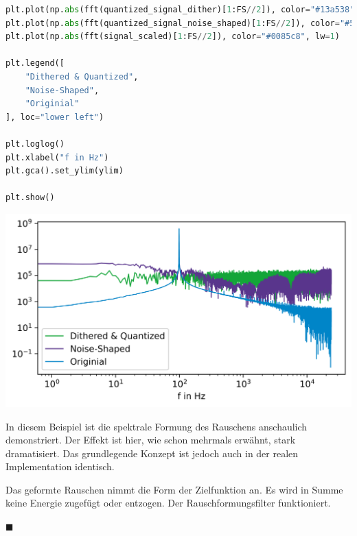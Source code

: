 \begin{lstlisting}[language=Python]
plt.plot(np.abs(fft(quantized_signal_dither)[1:FS//2]), color="#13a538", lw=1)
plt.plot(np.abs(fft(quantized_signal_noise_shaped)[1:FS//2]), color="#59358c", lw=1)
plt.plot(np.abs(fft(signal_scaled)[1:FS//2]), color="#0085c8", lw=1)

plt.legend([
    "Dithered & Quantized",
    "Noise-Shaped",
    "Originial"
], loc="lower left")

plt.loglog()
plt.xlabel("f in Hz")
plt.gca().set_ylim(ylim)

plt.show()
\end{lstlisting}

\includegraphics{./img/fef32f2adb64de57ffed8c50197b3d3a748716a9.png}

In diesem Beispiel ist die spektrale Formung des Rauschens anschaulich
demonstriert. Der Effekt ist hier, wie schon mehrmals erwähnt, stark
dramatisiert. Das grundlegende Konzept ist jedoch auch in der realen
Implementation identisch.

Das geformte Rauschen nimmt die Form der Zielfunktion an. Es wird in
Summe keine Energie zugefügt oder entzogen. Der Rauschformungsfilter
funktioniert.

\hfill\(\blacksquare\)
